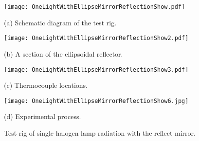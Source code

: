 \begin{figure}
  \begin{minipage}[t]{0.5\linewidth} %
  \nonumber
    \centering
    \texttt{[image: OneLightWithEllipseMirrorReflectionShow.pdf]}
    \centerline{(a) Schematic diagram of the test rig.}
    \label{Fig:OneLightWithEllipseMirrorReflectionShow}
  \end{minipage}%
  \begin{minipage}[t]{0.5\linewidth}
    \centering
    \texttt{[image: OneLightWithEllipseMirrorReflectionShow2.pdf]}
    \centerline{(b) A section of the ellipsoidal reflector.}
    \label{Fig:OneLightWithEllipseMirrorReflectionShow2}
  \end{minipage}

  \begin{minipage}[t]{0.5\linewidth} %
  \nonumber
    \centering
    \texttt{[image: OneLightWithEllipseMirrorReflectionShow3.pdf]}
    \centerline{(c) Thermocouple locations.}
    \label{Fig:OneLightWithEllipseMirrorReflectionShow3}
  \end{minipage}%
  \begin{minipage}[t]{0.5\linewidth}
    \centering
    \texttt{[image: OneLightWithEllipseMirrorReflectionShow6.jpg]}
    \centerline{(d) Experimental process.}
    \label{Fig:OneLightWithEllipseMirrorReflectionShow6}
  \end{minipage}


  \caption{Test rig of single halogen lamp radiation with the reflect mirror.}
  \label{Fig:OneLightWithEllipseMirrorReflectionShow}
\end{figure}


